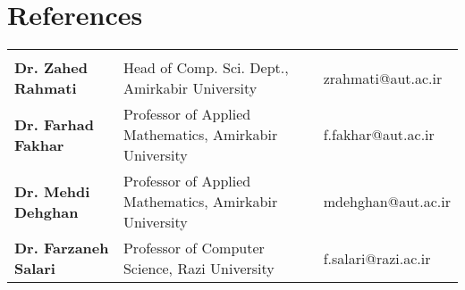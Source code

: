 \section{References}

\begin{tabularx}{\textwidth} { 
  >{\raggedright\arraybackslash}l
  >{\centering}X
  >{\raggedleft\arraybackslash}l }
\multicolumn{3}{c}{} \\	%
\textbf{Dr. Zahed Rahmati} & 
Head of Comp. Sci. Dept., Amirkabir University   & 
zrahmati@aut.ac.ir \\ 

\textbf{Dr. Farhad Fakhar} & 
Professor of Applied Mathematics, Amirkabir University &  f.fakhar@aut.ac.ir  
\\ 

\textbf{Dr. Mehdi Dehghan} &
Professor of Applied Mathematics, Amirkabir University & 
mdehghan@aut.ac.ir \\ 

\textbf{Dr. Farzaneh Salari} & 
Professor of Computer Science, Razi University & 
f.salari@razi.ac.ir \\ 

\end{tabularx}

